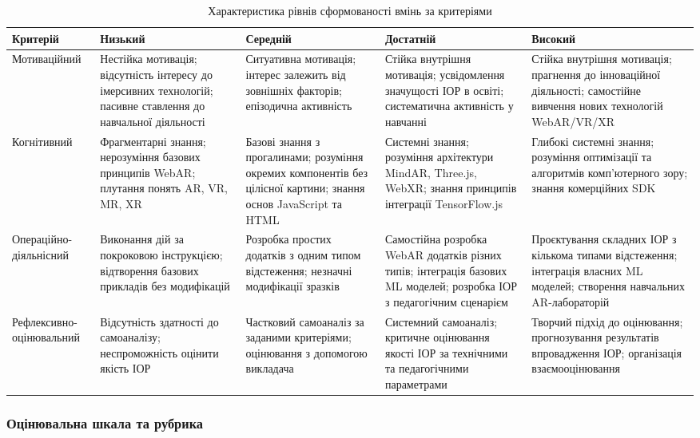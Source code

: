 \begin{table}[htbp]
\centering
\caption{Характеристика рівнів сформованості вмінь за критеріями}
\label{tab:criteria_levels_ier}
\small
\begin{tabular}{|p{2cm}|p{3cm}|p{3cm}|p{3cm}|p{3cm}|}
\hline
\textbf{Критерій} & \textbf{Низький} & \textbf{Середній} & \textbf{Достатній} & \textbf{Високий} \\
\hline
Мотива\-ційний &
Нестійка мотивація; відсутність інтересу до імерсивних технологій; пасивне ставлення до навчальної діяльності &
Ситуативна мотивація; інтерес залежить від зовнішніх факторів; епізодична активність &
Стійка внутрішня мотивація; усвідомлення значущості ІОР в освіті; систематична активність у навчанні &
Стійка внутрішня мотивація; прагнення до інноваційної діяльності; самостійне вивчення нових технологій WebAR/VR/XR \\
\hline
Когні\-тивний &
Фрагментарні знання; нерозуміння базових принципів WebAR; плутання понять AR, VR, MR, XR &
Базові знання з прогалинами; розуміння окремих компонентів без цілісної картини; знання основ JavaScript та HTML &
Системні знання; розуміння архітектури MindAR, Three.js, WebXR; знання принципів інтеграції TensorFlow.js &
Глибокі системні знання; розуміння оптимізації та алгоритмів комп'ютерного зору; знання комерційних SDK \\
\hline
Опера\-ційно-діяль\-нісний &
Виконання дій за покроковою інструкцією; відтворення базових прикладів без модифікацій &
Розробка простих додатків з одним типом відстеження; незначні модифікації зразків &
Самостійна розробка WebAR додатків різних типів; інтеграція базових ML моделей; розробка ІОР з педагогічним сценарієм &
Проєктування складних ІОР з кількома типами відстеження; інтеграція власних ML моделей; створення навчальних AR-лабораторій \\
\hline
Рефлек\-сивно-оціню\-вальний &
Відсутність здатності до самоаналізу; неспроможність оцінити якість ІОР &
Частковий самоаналіз за заданими критеріями; оцінювання з допомогою викладача &
Системний самоаналіз; критичне оцінювання якості ІОР за технічними та педагогічними параметрами &
Творчий підхід до оцінювання; прогнозування результатів впровадження ІОР; організація взаємо\-оцінювання \\
\hline
\end{tabular}
\end{table}

\subsubsection{Оцінювальна шкала та рубрика}

